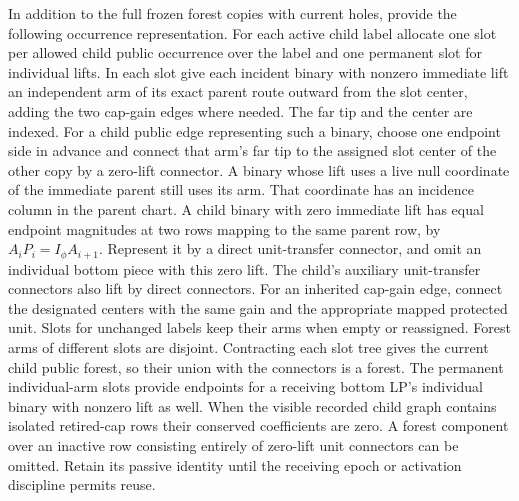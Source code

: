 \documentclass[11pt]{article}
\begin{document}
In addition to the full frozen forest copies with current holes, provide the following occurrence representation. For each active child label allocate one slot per allowed child public occurrence over the label and one permanent slot for individual lifts. In each slot give each incident binary with nonzero immediate lift an independent arm of its exact parent route outward from the slot center, adding the two cap-gain edges where needed. The far tip and the center are indexed. For a child public edge representing such a binary, choose one endpoint side in advance and connect that arm's far tip to the assigned slot center of the other copy by a zero-lift connector. A binary whose lift uses a live null coordinate of the immediate parent still uses its arm. That coordinate has an incidence column in the parent chart. A child binary with zero immediate lift has equal endpoint magnitudes at two rows mapping to the same parent row, by \(A_iP_i=I_\phi A_{i+1}\). Represent it by a direct unit-transfer connector, and omit an individual bottom piece with this zero lift. The child's auxiliary unit-transfer connectors also lift by direct connectors. For an inherited cap-gain edge, connect the designated centers with the same gain and the appropriate mapped protected unit. Slots for unchanged labels keep their arms when empty or reassigned. Forest arms of different slots are disjoint. Contracting each slot tree gives the current child public forest, so their union with the connectors is a forest. The permanent individual-arm slots provide endpoints for a receiving bottom LP's individual binary with nonzero lift as well. When the visible recorded child graph contains isolated retired-cap rows their conserved coefficients are zero. A forest component over an inactive row consisting entirely of zero-lift unit connectors can be omitted. Retain its passive identity until the receiving epoch or activation discipline permits reuse.
\end{document}
